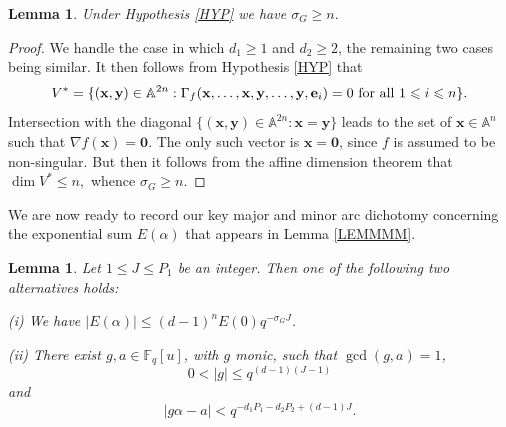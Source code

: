 \documentclass[12pt, reqno]{amsart}
\numberwithin{equation}{section}
\newcommand{\0}{\mathbf{0}}
\renewcommand{\AA}{\mathbb{A}}
\newcommand{\FF}{\mathbb{F}}
\renewcommand{\leq}{\leqslant}
\renewcommand{\geq}{\geqslant}
\newcommand{\x}{\mathbf{x}}
\newcommand{\y}{\mathbf{y}}
\newcommand{\ee}{\mathbf{e}}
\renewcommand{\=}{\equiv}
\newcommand{\1}{\mathbf{1}}
\newtheorem{lemma}[theorem]{Lemma}
\theoremstyle{definition}
\begin{document}
\begin{lemma}
\label{lemma5.1}
Under Hypothesis \ref{HYP} we have
$
\sigma_G \geq n.
$
\end{lemma}

\begin{proof}
We handle the case in which $d_1 \geq 1$ and $d_2 \geq 2$, the remaining two cases being similar.  
It then follows from Hypothesis \ref{HYP} that 
$$
V^* = \{ (\x, \y) \in  \AA^{2n}:   \Gamma_f (\x, \dots, \x, \y, \dots, \y,  \ee_{i} ) = 0  \textnormal{ for all $1 \leq i \leq n$} \}.
$$
Intersection with the diagonal 
$\{ (\x, \y) \in  \AA^{2n}:   \x = \y  \}$ leads to the set of $\x\in \AA^n$ such that $\nabla f(\x)=\0$. 
The only such vector is $\x=\0$, since $f$ is assumed to be non-singular. But then it follows
from the affine dimension theorem that
$
\dim V^* \leq  n,
$
whence $\sigma_G \geq n$.
\end{proof}


We are now ready to record our key major and minor arc dichotomy concerning the exponential sum $E(\alpha)$ that appears in Lemma \ref{LEMMMM}. 

\begin{lemma}
\label{6.2}
Let $1 \leq J \leq P_1$ be an integer. Then one of the following two alternatives holds:

\textnormal{(i)} We have
$
| E (\alpha)|
\leq
(d-1)^{n} E(0)
q^{- \sigma_G J  }$.

\textnormal{(ii)}
There exist $g, a \in \FF_q[u]$, with $g$ monic, such that $\gcd(g, a) = 1$,
$$
0 < |g| \leq q^{  (d-1) (J-1) }
$$
and
$$
| g \alpha - a | < q^{ - d_1 P_1 - d_2 P_2 + (d - 1) J }.
$$
\end{lemma}
\end{document}

